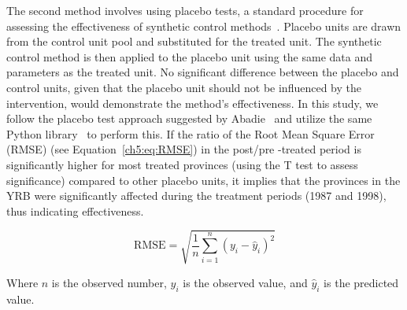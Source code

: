 The second method involves using placebo tests, a standard procedure for assessing the effectiveness of synthetic control methods~\cite{abadie2010}.
Placebo units are drawn from the control unit pool and substituted for the treated unit.
The synthetic control method is then applied to the placebo unit using the same data and parameters as the treated unit.
No significant difference between the placebo and control units, given that the placebo unit should not be influenced by the intervention, would demonstrate the method's effectiveness.
In this study, we follow the placebo test approach suggested by Abadie~\cite{abadie2010} and utilize the same Python library~\cite{engelbrektson2023} to perform this.
If the ratio of the Root Mean Square Error (RMSE) (see Equation~\ref{ch5:eq:RMSE}) in the post/pre -treated period is significantly higher for most treated provinces (using the T test to assess significance) compared to other placebo units, it implies that the provinces in the YRB were significantly affected during the treatment periods (1987 and 1998), thus indicating effectiveness.

\begin{equation}
    \label{ch5:eq:RMSE}
    \text{RMSE} = \sqrt{\frac{1}{n}\sum_{i=1}^{n}{(y_i-\hat{y}_i)}^2}
\end{equation}

Where $n$ is the observed number, $y_i$ is the observed value, and $\hat{y}_i$ is the predicted value.
